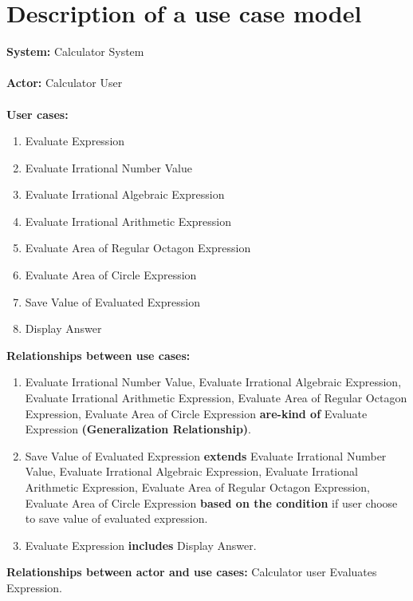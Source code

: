 \section{Description of a use case model}
\textbf{System:} Calculator System \\ \\
\textbf{Actor:} Calculator User \\ \\
\textbf{User cases: }
\begin{enumerate}
  \item Evaluate Expression
  \item Evaluate Irrational Number Value
  \item Evaluate Irrational Algebraic Expression
  \item Evaluate Irrational Arithmetic Expression
  \item Evaluate Area of Regular Octagon Expression
  \item Evaluate Area of Circle Expression
  \item Save Value of Evaluated Expression
  \item Display Answer \\
\end{enumerate}
\textbf{Relationships between use cases:}
\begin{enumerate}
  \item Evaluate Irrational Number Value, Evaluate Irrational Algebraic Expression, Evaluate Irrational Arithmetic Expression, Evaluate Area of Regular Octagon Expression, Evaluate Area of Circle Expression \textbf{are-kind of} Evaluate Expression \textbf{(Generalization Relationship)}.
  \item Save Value of Evaluated Expression \textbf{extends} Evaluate Irrational Number Value, Evaluate Irrational Algebraic Expression, Evaluate Irrational Arithmetic Expression, Evaluate Area of Regular Octagon Expression, Evaluate Area of Circle Expression \textbf{based on the condition} if user choose to save value of evaluated expression.
  \item Evaluate Expression \textbf{includes} Display Answer. \\
\end{enumerate}
\textbf{Relationships between actor and use cases:}
Calculator user Evaluates Expression.

